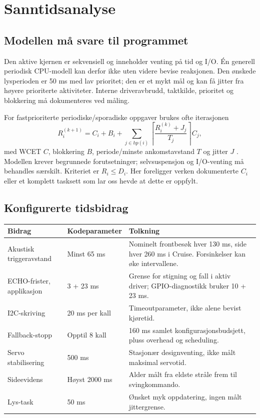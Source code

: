 \chapter{Sanntidsanalyse}
\label{ch:timing}
\section{Modellen må svare til programmet}
Den aktive kjernen er sekvensiell og inneholder venting på tid og I/O.
Én generell periodisk CPU-modell kan derfor ikke uten videre bevise
reaksjonen. Den ønskede lysperioden er 50 ms med lav prioritet; den er et
mykt mål og kan få jitter fra høyere prioriterte aktiviteter. Interne
driveravbrudd, taktkilde, prioritet og blokkering må dokumenteres ved måling.

For fastprioriterte periodiske/sporadiske oppgaver brukes ofte iterasjonen
\begin{equation}\label{eq:rta}
 R_i^{(k+1)}=C_i+B_i+
 \sum_{j\in hp(i)}\left\lceil\frac{R_i^{(k)}+J_j}{T_j}\right\rceil C_j,
\end{equation}
med WCET $C$, blokkering $B$, periode/minste ankomstavstand $T$ og jitter
$J$ \cite{josephpandya,rta}. Modellen krever begrunnede forutsetninger;
selvsuspensjon og I/O-venting må behandles særskilt. Kriteriet er
$R_i\le D_i$. Her foreligger verken dokumenterte $C_i$ eller et komplett
tasksett som lar oss hevde at dette er oppfylt.

\section{Konfigurerte tidsbidrag}
\begin{tabularx}{\textwidth}{@{}P{42mm}P{29mm}Y@{}}\toprule
Bidrag & Kodeparameter & Tolkning\\\midrule
Akustisk triggeravstand & Minst 65 ms & Nominelt frontbesøk hver 130 ms, side hver 260 ms i Cruise. Forsinkelser kan øke intervallene.\\
ECHO-frister, applikasjon & 3 + 23 ms & Grense for stigning og fall i aktiv driver; GPIO-diagnostikk bruker 10 + 23 ms.\\
I2C-skriving & 20 ms per kall & Timeoutparameter, ikke alene bevist kjøretid.\\
Fallback-stopp & Opptil 8 kall & 160 ms samlet konfigurasjonsbudsjett, pluss overhead og scheduling.\\
Servo stabilisering & 500 ms & Stasjonær designventing, ikke målt maksimal servotid.\\
Sideevidens & Høyst 2000 ms & Alder målt fra eldste stråle frem til svingkommando.\\
Lys-task & 50 ms & Ønsket myk oppdatering, ingen målt jittergrense.\\\bottomrule
\end{tabularx}

